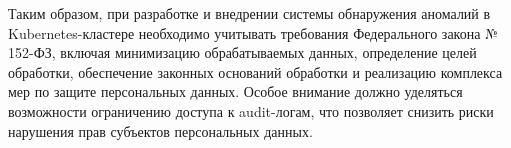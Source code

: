 Таким образом, при разработке и внедрении системы обнаружения аномалий в Kubernetes-кластере необходимо учитывать требования Федерального закона № 152-ФЗ, включая минимизацию обрабатываемых данных, определение целей обработки, обеспечение законных оснований обработки и реализацию комплекса мер по защите персональных данных. Особое внимание должно уделяться возможности ограничению доступа к audit-логам, что позволяет снизить риски нарушения прав субъектов персональных данных.